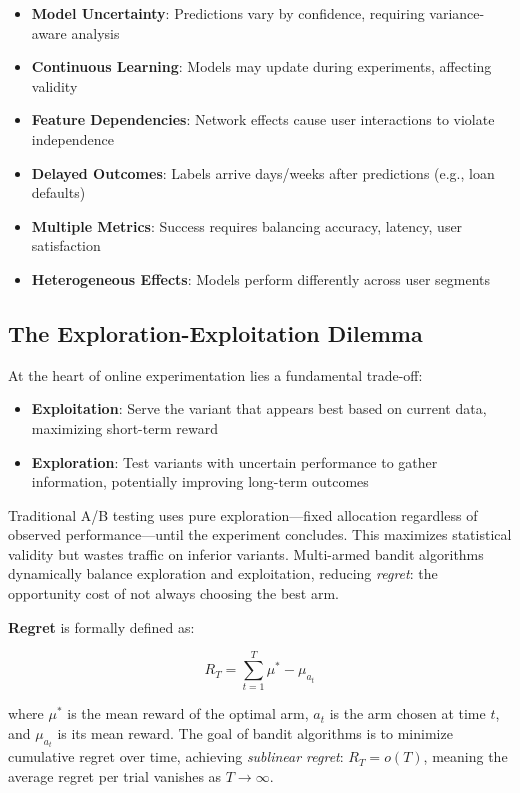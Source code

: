 \begin{itemize}
    \item \textbf{Model Uncertainty}: Predictions vary by confidence, requiring variance-aware analysis
    \item \textbf{Continuous Learning}: Models may update during experiments, affecting validity
    \item \textbf{Feature Dependencies}: Network effects cause user interactions to violate independence
    \item \textbf{Delayed Outcomes}: Labels arrive days/weeks after predictions (e.g., loan defaults)
    \item \textbf{Multiple Metrics}: Success requires balancing accuracy, latency, user satisfaction
    \item \textbf{Heterogeneous Effects}: Models perform differently across user segments
\end{itemize}

\subsection{The Exploration-Exploitation Dilemma}

At the heart of online experimentation lies a fundamental trade-off:

\begin{itemize}
    \item \textbf{Exploitation}: Serve the variant that appears best based on current data, maximizing short-term reward
    \item \textbf{Exploration}: Test variants with uncertain performance to gather information, potentially improving long-term outcomes
\end{itemize}

Traditional A/B testing uses pure exploration---fixed allocation regardless of observed performance---until the experiment concludes. This maximizes statistical validity but wastes traffic on inferior variants. Multi-armed bandit algorithms dynamically balance exploration and exploitation, reducing \textit{regret}: the opportunity cost of not always choosing the best arm.

\textbf{Regret} is formally defined as:

\begin{equation}
R_T = \sum_{t=1}^{T} \mu^* - \mu_{a_t}
\end{equation}

where $\mu^*$ is the mean reward of the optimal arm, $a_t$ is the arm chosen at time $t$, and $\mu_{a_t}$ is its mean reward. The goal of bandit algorithms is to minimize cumulative regret over time, achieving \textit{sublinear regret}: $R_T = o(T)$, meaning the average regret per trial vanishes as $T \to \infty$.

